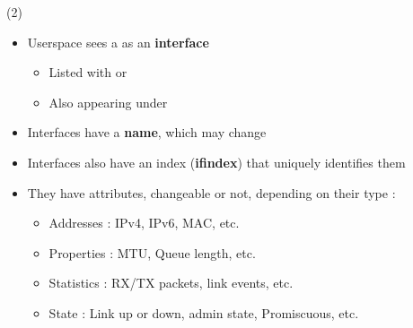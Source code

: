 \begin{frame}{ (2)}
	\begin{itemize}
		\item Userspace sees a  as an \textbf{interface}
			\begin{itemize}
				\item Listed with  or 
				\item Also appearing under 
			\end{itemize}
		\item Interfaces have a \textbf{name}, which may change
		\item Interfaces also have an index (\textbf{ifindex}) that uniquely identifies them
		\item They have attributes, changeable or not, depending on their type :
			\begin{itemize}
				\item Addresses : IPv4, IPv6, MAC, etc.
				\item Properties : MTU, Queue length, etc.
				\item Statistics : RX/TX packets, link events, etc.
				\item State : Link up or down, admin state, Promiscuous, etc.
			\end{itemize}
	\end{itemize}
\end{frame}

